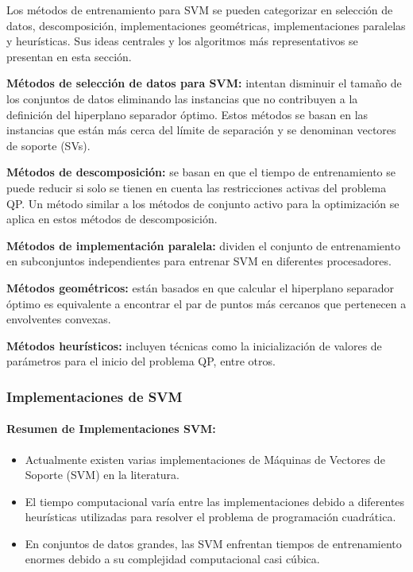 Los métodos de entrenamiento para SVM se pueden categorizar en selección de datos, descomposición, implementaciones geométricas, implementaciones paralelas y heurísticas. Sus ideas centrales y los algoritmos más representativos se presentan en esta sección.

\textbf{Métodos de selección de datos para SVM:} intentan disminuir el tamaño de los conjuntos de datos eliminando las instancias que no contribuyen a la definición del hiperplano separador óptimo. Estos métodos se basan en las instancias que están más cerca del límite de separación y se denominan vectores de soporte (SVs).

\textbf{Métodos de descomposición:} se basan en que el tiempo de entrenamiento se puede reducir si solo se tienen en cuenta las restricciones activas del problema QP. Un método similar a los métodos de conjunto activo para la optimización se aplica en estos métodos de descomposición.

\textbf{Métodos de implementación paralela:} dividen el conjunto de entrenamiento en subconjuntos independientes para entrenar SVM en diferentes procesadores.

\textbf{Métodos geométricos:} están basados en que calcular el hiperplano separador óptimo es equivalente a encontrar el par de puntos más cercanos que pertenecen a envolventes convexas.

\textbf{Métodos heurísticos:} incluyen técnicas como la inicialización de valores de parámetros para el inicio del problema QP, entre otros.



\subsubsection{Implementaciones de SVM}
\paragraph{Resumen de Implementaciones SVM:}
\begin{itemize}
	\item Actualmente existen varias implementaciones de Máquinas de Vectores de Soporte (SVM) en la literatura.
	\item El tiempo computacional varía entre las implementaciones debido a diferentes heurísticas utilizadas para resolver el problema de programación cuadrática.
	\item En conjuntos de datos grandes, las SVM enfrentan tiempos de entrenamiento enormes debido a su complejidad computacional casi cúbica.
\end{itemize}

